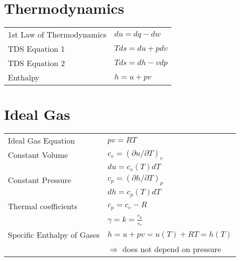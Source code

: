 \documentclass{article}
\begin{document}
\begin{multicols*}{2}

\section*{Thermodynamics}
\begin{tabular}{l l}
    1st Law of Thermodynamics & $du = dq - dw$  \\
    TDS Equation 1 & $Tds = du + pdv$ \\
    TDS Equation 2 & $Tds = dh - vdp$ \\
    Enthalpy & $h = u + pv$
\end{tabular}

\section*{Ideal Gas}
\begin{tabular}{l l}
    Ideal Gas Equation & $pv = RT$ \\
    Constant Volume & $c_v = (\partial u / \partial T)_v$ \\
     & $du = c_v (T) dT$ \\
     Constant Pressure & $c_p = (\partial h / \partial T)_p$ \\
     & $dh = c_p (T) dT$ \\
     Thermal coefficients & $c_p = c_v - R$ \\
      & $\gamma = k = \frac{c_p}{c_v}$ \\
      Specific Enthalpy of Gases & $h = u + pv = u(T) + RT = h(T)$ \\
       & $\Rightarrow$ does not depend on pressure
\end{tabular}

\end{multicols*}
\end{document}
